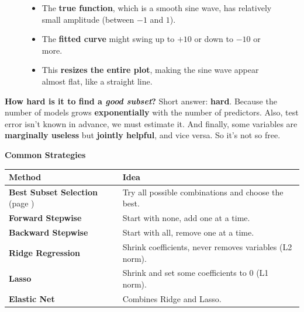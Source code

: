 \begin{figure}[!htp]
{\begin{itemize}
        \begin{itemize}
            \item The \textbf{true function}, which is a smooth sine wave, has relatively small amplitude (between $-1$ and $1$).
            \item The \textbf{fitted curve} might swing up to $+10$ or down to $-10$ or more.
            \item This \textbf{resizes the entire plot}, making the sine wave appear almost flat, like a straight line.
        \end{itemize}
    \end{itemize}}
\end{figure}

\highspace
\textcolor{Red2}{ \textbf{How hard is it to find a \emph{good subset}?}} Short answer: \textbf{hard}. Because the number of models grows \textbf{exponentially} with the number of predictors. Also, test error isn't known in advance, we must estimate it. And finally, some variables are \textbf{marginally useless} but \textbf{jointly helpful}, and vice versa. So it's not so free.

\highspace
\begin{flushleft}
    \textcolor{Green3}{ \textbf{Common Strategies}}
\end{flushleft}
\begin{table}[!htp]
    \centering
    \begin{adjustbox}{width={\textwidth},totalheight={\textheight},keepaspectratio}
        \begin{tabular}{@{} l l @{}}
            \toprule
            Method & Idea \\
            \midrule
            \textbf{Best Subset Selection} (page \pageref{subsubsection: Best Subset Selection})  & Try all possible combinations and choose the best.           \\ [.3em]
            \textbf{Forward Stepwise}       & Start with none, add one at a time.                        \\ [.3em]
            \textbf{Backward Stepwise}      & Start with all, remove one at a time.                      \\ [.3em]
            \textbf{Ridge Regression}       & Shrink coefficients, never removes variables (L2 norm).    \\ [.3em]
            \textbf{Lasso}                  & Shrink and set some coefficients to 0 (L1 norm).       \\ [.3em]
            \textbf{Elastic Net}            & Combines Ridge and Lasso.                                    \\
            \bottomrule
        \end{tabular}
    \end{adjustbox}
\end{table}